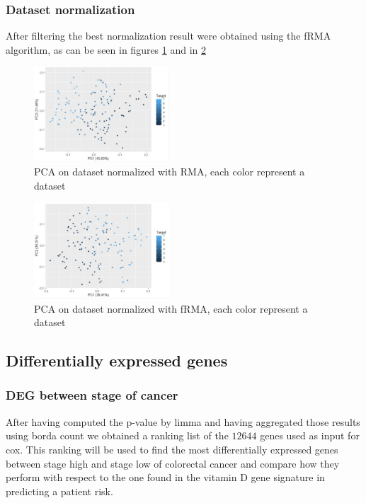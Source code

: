 \documentclass[fleqn,10pt]{SelfArx} %
\begin{document}
		\subsubsection{Dataset normalization}
		After filtering the best normalization result were obtained using the fRMA algorithm, as can be seen in figures \ref{fig:pre_norm} and in \ref{fig:post_norm}

		\begin{figure}[ht]
			\includegraphics[width=0.45\textwidth]{figures/pre_norm.png}
			\caption{PCA on dataset normalized with RMA, each color represent a dataset}
			\label{fig:pre_norm}
		\end{figure}

		\begin{figure}[ht]
			\includegraphics[width=0.45\textwidth]{figures/post_norm.png}
			\caption{PCA on dataset normalized with fRMA, each color represent a dataset}
			\label{fig:post_norm}
		\end{figure}

	\subsection{Differentially expressed genes}

		\subsubsection{DEG between stage of cancer}
		After having computed the p-value by limma and having aggregated those results using borda count we obtained a ranking list of the $12644$ genes used as input for cox.
		This ranking will be used to find the most differentially expressed genes between stage high and stage low of colorectal cancer and compare how they perform with respect to the one found in the vitamin D gene signature in predicting a patient risk.
\end{document}
